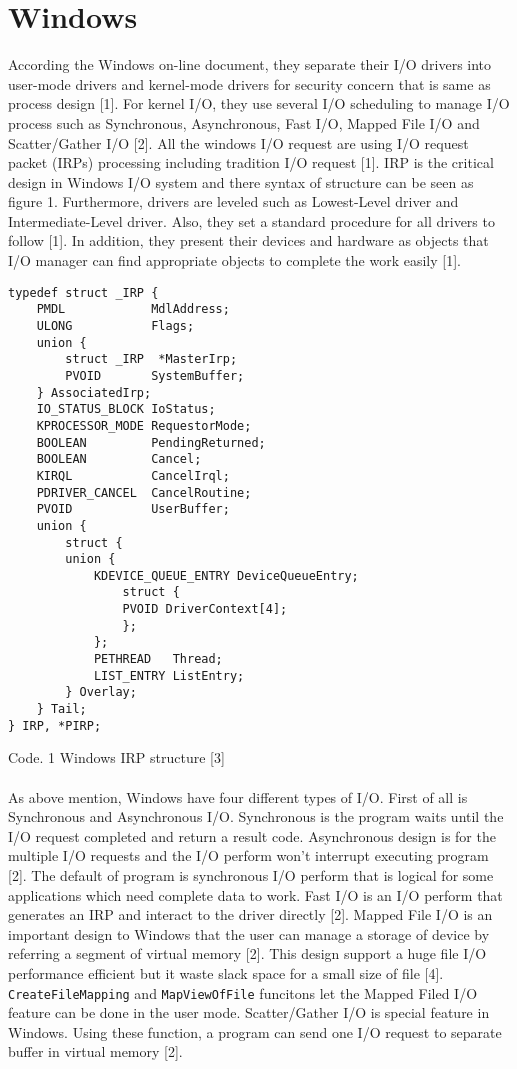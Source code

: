 \documentclass[letterpaper,draftclsnofoot,journal,compsoc,10pt,onecolumn]{IEEEtran}
\begin{document}
\section{Windows}
\indent According the Windows on-line document, they separate their I/O drivers into user-mode drivers and kernel-mode drivers for security concern that is same as process design [1]. For kernel I/O, they use several I/O scheduling to manage I/O process such as Synchronous, Asynchronous, Fast I/O, Mapped File I/O and Scatter/Gather I/O [2]. All the windows I/O request are using I/O request packet (IRPs) processing including tradition I/O request [1]. IRP is the critical design in Windows I/O system and there syntax of structure can be seen as figure 1. Furthermore, drivers are leveled such as Lowest-Level driver and Intermediate-Level driver. Also, they set a standard procedure for all drivers to follow [1]. In addition, they present their devices and hardware as objects that I/O manager can find appropriate objects to complete the work easily [1].\\
\begin{lstlisting}[style=CStyle] 
typedef struct _IRP {
	PMDL            MdlAddress;
	ULONG           Flags;
	union {
		struct _IRP  *MasterIrp;
		PVOID       SystemBuffer;
	} AssociatedIrp;
	IO_STATUS_BLOCK IoStatus;
	KPROCESSOR_MODE RequestorMode;
	BOOLEAN         PendingReturned;
	BOOLEAN         Cancel;
	KIRQL           CancelIrql;
	PDRIVER_CANCEL  CancelRoutine;
	PVOID           UserBuffer;
	union {
		struct {
		union {
			KDEVICE_QUEUE_ENTRY DeviceQueueEntry;
				struct {
				PVOID DriverContext[4];
				};
			};
			PETHREAD   Thread;
			LIST_ENTRY ListEntry;
		} Overlay;
	} Tail;
} IRP, *PIRP;
\end{lstlisting}
Code. 1 Windows IRP structure [3]
\\\\
\indent As above mention, Windows have four different types of I/O. First of all is Synchronous and Asynchronous I/O. Synchronous is the program waits until the I/O request completed and return a result code. Asynchronous design is for the multiple I/O requests and the I/O perform won’t interrupt executing program [2]. The default of program is synchronous I/O perform that is logical for some applications which need complete data to work. Fast I/O is an I/O perform that generates an IRP and interact to the driver directly [2]. Mapped File I/O is an important design to Windows that the user can manage a storage of device by referring a segment of virtual memory [2]. This design support a huge file I/O performance efficient but it waste slack space for a small size of file [4]. \texttt{CreateFileMapping} and \texttt{MapViewOfFile} funcitons let the Mapped Filed I/O feature can be done in the user mode. Scatter/Gather I/O is special feature in Windows. Using these function, a program can send one I/O request to separate buffer in virtual memory [2].
\end{document}
